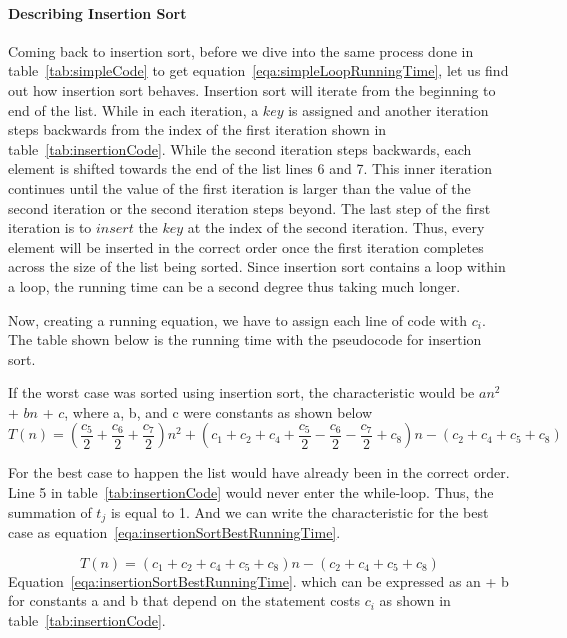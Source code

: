 \documentclass[12pt]{article}
\begin{document}
	\paragraph{Describing Insertion Sort}
	Coming back to insertion sort, before we dive into the same process done in table~\ref{tab:simpleCode} to get equation~\ref{eqa:simpleLoopRunningTime}, let us find out how insertion sort behaves.
	Insertion sort will iterate from the beginning to end of the list.
	While in each iteration, a $key$ is assigned and another iteration steps backwards from the index of the first iteration shown in table~\ref{tab:insertionCode}.
	While the second iteration steps backwards, each element is shifted towards the end of the list lines 6 and 7.
	This inner iteration continues until the value of the first iteration is larger than the value of the second iteration or the second iteration steps beyond.
	The last step of the first iteration is to $\textit{insert}$ the $key$ at the index of the second iteration.
	Thus, every element will be inserted in the correct order once the first iteration completes across the size of the list being sorted.
	Since insertion sort contains a loop within a loop, the running time can be a second degree thus taking much longer.
	
	Now, creating a running equation, we have to assign each line of code with $c_i$.
	The table shown below is the running time with the pseudocode for insertion sort.
	
	
	
	If the worst case was sorted using insertion sort, the characteristic would be $an^2$ + $bn$ + $c$, where a, b, and c were constants as shown below
	\begin{equation}
	T(n) = (\frac{c_5}{2} + \frac{c_6}{2} + \frac{c_7}{2})n^2 + (c_1 + c_2 + c_4 + \frac{c_5}{2} - \frac{c_6}{2} - \frac{c_7}{2} + c_8)n - (c_2 + c_4 + c_5 + c_8)
	\label{eqa:insertionSortWorstRunningTime}
	\end{equation}
	
	For the best case to happen the list would have already been in the correct order.
	Line 5 in table~\ref{tab:insertionCode} would never enter the while-loop.
	Thus, the summation of $t_j$ is equal to 1.
	And we can write the characteristic for the best case as equation~\ref{eqa:insertionSortBestRunningTime}.
	
	\begin{equation}
	T(n) = (c_1 + c_2 + c_4 + c_5 + c_8)n - (c_2 + c_4 + c_5 + c_8)
	\label{eqa:insertionSortBestRunningTime}
	\end{equation}
	Equation~\ref{eqa:insertionSortBestRunningTime}.
	which can be expressed as an + b for constants a and b that depend on the statement costs $c_i$ as shown in table~\ref{tab:insertionCode}.
	
\end{document}
